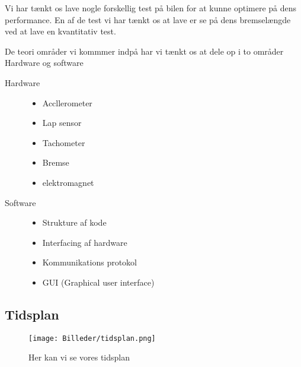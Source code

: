 Vi har tænkt os lave nogle forskellig test på bilen for at kunne optimere på dens performance. En af de test vi har tænkt os at lave er se på dens bremselængde ved at lave en kvantitativ test.

De teori områder vi kommmer indpå har vi tænkt os at dele op i to områder Hardware og software
\begin{description}


\item[Hardware] \hfill
		\begin{itemize}
			\item Accllerometer
			\item Lap sensor
			\item Tachometer
			\item Bremse
			\item elektromagnet
		\end{itemize}
		
\item[Software] \hfill
		\begin{itemize}
			\item Strukture af kode
			\item Interfacing af hardware
			\item Kommunikations protokol
			\item GUI (Graphical user interface)
		\end{itemize}
\end{description}
 

\subsection{Tidsplan}

\begin{figure}[h]
	\centering
		\texttt{[image: Billeder/tidsplan.png]}
	\caption{Her kan vi se vores tidsplan}
	\label{fig:tidsplan}
\end{figure}